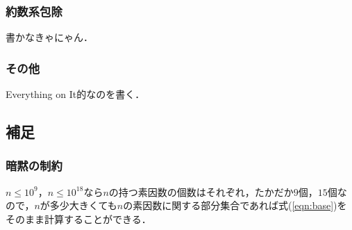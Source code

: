 \documentclass{jsarticle}
\begin{document}
\subsubsection{約数系包除}
書かなきゃにゃん．

\subsubsection{その他}
Everything on It的なのを書く．

\subsection{補足}
\subsubsection{暗黙の制約}
$n\le 10^9$，$n\le 10^{18}$なら$n$の持つ素因数の個数はそれぞれ，たかだか$9$個，$15$個なので，$n$が多少大きくても$n$の素因数に関する部分集合であれば式(\ref{eqn:base})をそのまま計算することができる．
\end{document}
